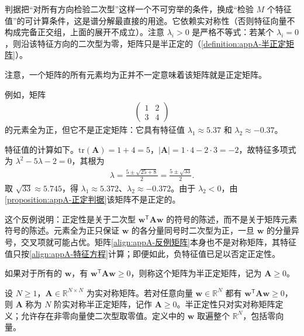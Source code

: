 \documentclass[../main.tex]{subfiles}
\begin{document}
\begin{remark}
判据把“对所有方向检验二次型”这样一个不可穷举的条件，换成“检验 $M$ 个特征值”的可计算条件，这是谱分解最直接的用途。它依赖实对称性（否则特征向量不构成完备正交组，上面的展开不成立）。注意 $\lambda_i>0$ 是严格不等式：若某个 $\lambda_i=0$，则沿该特征方向的二次型为零，矩阵只是半正定的（\cref{definition:appA-半正定矩阵}）。
\end{remark}

注意，一个矩阵的所有元素均为正并不一定意味着该矩阵就是正定矩阵。

\begin{example}[ 元素全为正但非正定]\label{example:appA-元素全正非正定}
例如，矩阵
\begin{align}
  \begin{pmatrix}1&2\\3&4\end{pmatrix}
  \label{align:appA-反例矩阵}
\end{align}
的元素全为正，但它不是正定矩阵：它具有特征值 $\lambda_1\approx5.37$ 和 $\lambda_2\approx-0.37$。
\end{example}

\begin{solution}
特征值的计算如下。$\mathrm{tr}(\bm{A})=1+4=5$，$|\bm{A}|=1\cdot4-2\cdot3=-2$，故特征多项式为 $\lambda^{2}-5\lambda-2=0$，其根为
\begin{align*}
 \lambda=\frac{5\pm\sqrt{25+8}}{2}=\frac{5\pm\sqrt{33}}{2}.
\end{align*}
取 $\sqrt{33}\approx5.745$，得 $\lambda_1\approx5.372$、$\lambda_2\approx-0.372$。由于 $\lambda_2<0$，由\cref{proposition:appA-正定判据}该矩阵不是正定的。
\end{solution}

\begin{remark}
这个反例说明：正定性是关于二次型 $\bm{w}^{\mathsf{T}}\bm{A}\bm{w}$ 的符号的陈述，而不是关于矩阵元素符号的陈述。元素全为正只保证 $\bm{w}$ 的各分量同号时二次型为正，一旦 $\bm{w}$ 的分量异号，交叉项就可能占优。矩阵\eqref{align:appA-反例矩阵}本身也不是对称矩阵，其特征值只按\eqref{align:appA-特征方程}计算；即便如此，负特征值已足以否定正定性。
\end{remark}

如果对于所有的 $\bm{w}$，有 $\bm{w}^{\mathsf{T}}\bm{A}\bm{w}\geqslant0$，则称这个矩阵为半正定矩阵，记为 $\bm{A}\geqslant0$。

\begin{definition}[半正定矩阵]\label{definition:appA-半正定矩阵}
设 $N\geqslant1$，$\bm{A}\in\mathbb{R}^{N\times N}$ 为实对称矩阵。若对任意向量 $\bm{w}\in\mathbb{R}^{N}$ 都有 $\bm{w}^{\mathsf{T}}\bm{A}\bm{w}\geqslant0$，则 $\bm{A}$ 称为 $N$ 阶实对称半正定矩阵，记作 $\bm{A}\geqslant0$。半正定性只对实对称矩阵定义；允许存在非零向量使二次型取零值。定义中的 $\bm{w}$ 取遍整个 $\mathbb{R}^{N}$，包括零向量。
\end{definition}
\end{document}
